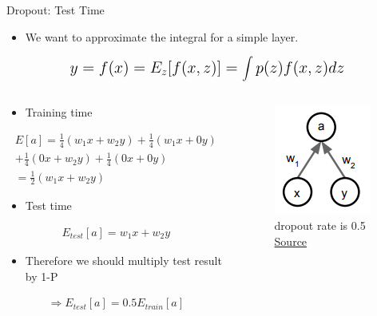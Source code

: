 \begin{frame}{Dropout: Test Time}
	\begin{itemize}
		\item We want to approximate the integral for a simple layer.
	\end{itemize}
	\begin{equation*}
		\mathlarger{\mathlarger{
			y = f(x) = E_z[f(x, z)] = \int p(z)f(x, z) dz
		}}
	\end{equation*}
	\begin{columns}
		\begin{column}[c]{0.4\textwidth}
			\begin{itemize}
				\item Training time
			\end{itemize}
			\begin{align*}
				E[a] = \frac{1}{4}(w_1 x + w_2 y) + \frac{1}{4}(w_1 x + 0 y) \\
				+ \frac{1}{4}(0 x + w_2 y) + \frac{1}{4}(0 x + 0 y)\\
				= \frac{1}{2}(w_1 x + w_2 y)
			\end{align*}
			\begin{itemize}
				\item Test time
			\end{itemize}
			\begin{align*}
				E_{test}[a] = w_1 x + w_2 y
			\end{align*}
			\begin{itemize}
				\item Therefore we should multiply test result by 1-P
			\end{itemize}
			\begin{align*}
				\Rightarrow E_{test}[a] = 0.5 E_{train}[a]
			\end{align*}
		\end{column}
		\begin{column}[c]{0.5\textwidth}
			\begin{figure}[H]
				\centering
				\includegraphics[height=0.4\textheight]{Figs/section_4/dropout_test.png}
				\caption{dropout rate is 0.5 \href{https://www.cs.toronto.edu/~hinton/absps/JMLRdropout.pdf}{Source}}
			\end{figure}
		\end{column}
	\end{columns}
\end{frame}



